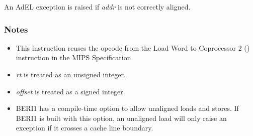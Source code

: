 An AdEL exception is raised if \emph{addr} is not correctly aligned.

\subsubsection*{Notes}

\begin{itemize}
\item
This instruction reuses the opcode from the Load Word to Coprocessor 2
() instruction in the MIPS Specification.
\item
\emph{rt} is treated as an unsigned integer.
\item
\emph{offset} is treated as a signed integer.
\item
BERI1 has a compile-time option to allow unaligned loads and stores. If BERI1
is built with this option, an unaligned load will only raise an exception if
it crosses a cache line boundary.
\end{itemize}

